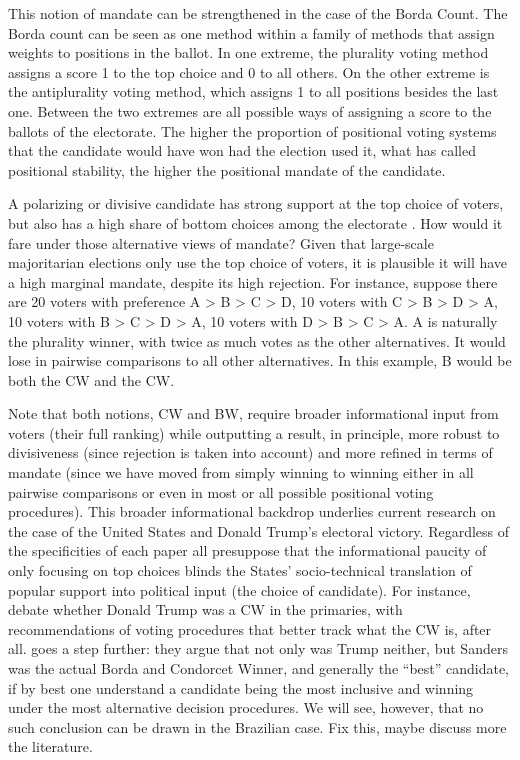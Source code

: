 \documentclass[hidelinks,11pt]{article}
\begin{document}
This notion of mandate can be strengthened in the case of the Borda Count. The
Borda count can be seen as one method within a family of methods that assign
weights to positions in the ballot. In one extreme, the plurality voting method
assigns a score 1 to the top choice and 0 to all others. On the other extreme is
the antiplurality voting method, which assigns 1 to all positions besides the
last one. Between the two extremes are all possible ways of assigning a score to
the ballots of the electorate. The higher the proportion of positional voting
systems that the candidate would have won had the election used it, what
\textcite{tabarrok2001president} has called positional stability, the higher the
positional mandate of the candidate.


A polarizing or divisive candidate has strong support at the top choice of
voters, but also has a high share of bottom choices among the electorate
\parencite{igersheim22_compar_votin_method}. How would it fare under those
alternative views of mandate? Given that large-scale majoritarian elections only
use the top choice of voters, it is plausible it will have a high marginal
mandate, despite its high rejection. For instance, suppose there are 20 voters
with preference A > B > C > D, 10 voters with C > B > D > A, 10 voters with B >
C > D > A, 10 voters with D > B > C > A. A is naturally the plurality winner,
with twice as much votes as the other alternatives. It would lose in pairwise
comparisons to all other alternatives. In this example, B would be both the CW
and the CW.


Note that both notions, CW and BW, require broader informational input from
voters (their full ranking) while outputting a result, in principle, more robust
to divisiveness (since rejection is taken into account) and more refined in
terms of mandate (since we have moved from simply winning to winning either in
all pairwise comparisons or even in most or all possible positional voting
procedures). This broader informational backdrop underlies current research on
the case of the United States and Donald Trump's electoral victory. Regardless
of the specificities of each paper all presuppose that the informational paucity
of only focusing on top choices blinds the States' socio-technical translation
of popular support into political input (the choice of candidate). For instance,
\textcite{potthoff2021condorcet, woon2020trump, kurrild2018trump} debate whether
Donald Trump was a CW in the primaries, with recommendations of voting
procedures that better track what the CW is, after all.
\textcite{igersheim22_compar_votin_method} goes a step further: they argue that
not only was Trump neither, but Sanders was the actual Borda and Condorcet
Winner, and generally the ``best'' candidate, if by best one understand a
candidate being the most inclusive and winning under the most alternative
decision procedures. We will see, however, that no such conclusion can be drawn
in the Brazilian case. \Big{\textcolor{red}{TODO}} Fix this, maybe discuss more
the literature.
\end{document}
